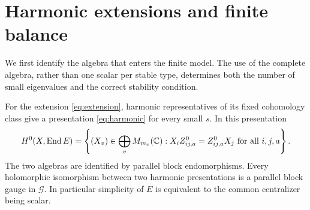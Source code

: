 \section{Harmonic extensions and finite balance}\label{sec:extensions}

We first identify the algebra that enters the finite model. The use of
the complete algebra, rather than one scalar per stable type, determines
both the number of small eigenvalues and the correct stability condition.

\begin{lemma}\label{lem:algebra}
For the extension \eqref{eq:extension}, harmonic representatives of its
fixed cohomology class give a presentation \eqref{eq:harmonic} for every
small $s$. In this presentation
\begin{equation}\label{eq:centralizer}
H^0(X,\operatorname{End} E)=
\left\{(X_v)\in\bigoplus_vM_{m_v}(\mathbb C):
X_iZ^0_{ij,a}=Z^0_{ij,a}X_j\text{ for all }i,j,a\right\}.
\end{equation}
The two algebras are identified by parallel block endomorphisms.
Every holomorphic isomorphism between two harmonic presentations is a
parallel block gauge in $\mathcal G$. In particular simplicity of $E$
is equivalent to the common centralizer being scalar.
\end{lemma}

